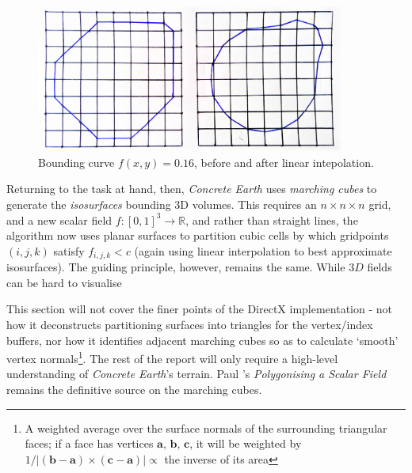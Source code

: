 \documentclass[a4paper, 11pt]{article}
\begin{document}
\begin{flushleft}
\begin{figure}[h]
\centering
\includegraphics[width=0.9\textwidth]{Interpolated Marching Squares}
\caption{Bounding curve $f(x,y) = 0.16$, before and after linear intepolation.}
\label{Interpolated Marching Squares}
\end{figure}

\vspace{5pt}\noindent
Returning to the task at hand, then, \textit{Concrete Earth} uses \textit{marching cubes} to generate the \textit{isosurfaces} bounding 3D volumes. This requires an $n \times n \times n$ grid, and a new scalar field $f: \left[0,1\right]^3 \rightarrow \mathbb{R}$, and rather than straight lines, the algorithm now uses planar surfaces to partition cubic cells by which gridpoints $(i,j,k)$ satisfy $f_{i,j,k} < c$ (again using linear interpolation to best approximate isosurfaces). The guiding principle, however, remains the same. While $3D$ fields can be hard to visualise




\vspace{5pt}\noindent
This section will not cover the finer points of the DirectX implementation - not how it deconstructs partitioning surfaces into triangles for the vertex/index buffers, nor how it identifies adjacent marching cubes so as to calculate `smooth' vertex normals\footnote{A weighted average over the surface normals of the surrounding triangular faces; if a face has vertices $\mathbf{a}$, $\mathbf{b}$, $\mathbf{c}$, it will be weighted by $1/|(\mathbf{b}-\mathbf{a})\times(\mathbf{c}-\mathbf{a})| \propto$ the inverse of its area}. The rest of the report will only require a high-level understanding of \textit{Concrete Earth}'s terrain. Paul \citeauthor{bourkeMarchingCubes}'s \textit{Polygonising a Scalar Field} \citeyearpar{bourkeMarchingCubes} remains the definitive source on the marching cubes. %


\end{flushleft}
\end{document}
